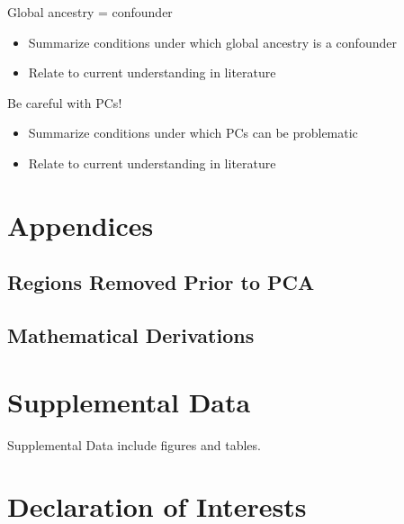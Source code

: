 \documentclass[12pt]{article}
\newcommand{\edit}[1]{{\color{red}{#1}}}
\begin{document}

Global ancestry = confounder
\begin{itemize}
\item Summarize conditions under which global ancestry is a confounder 
\item Relate to current understanding in literature
\end{itemize}

\noindent Be careful with PCs!
\begin{itemize}
\item Summarize conditions under which PCs can be problematic
\item Relate to current understanding in literature
\end{itemize}




\newpage
\section{Appendices}


\subsection{Regions Removed Prior to PCA}

\subsection{Mathematical Derivations}


\newpage
\section*{Supplemental Data}


Supplemental Data include \edit{??} figures and \edit{??} tables.

\section*{Declaration of Interests}
\end{document}
